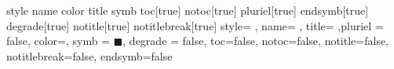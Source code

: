 

 {style}{}
 {name}{}
 {color}{}
 {title}{}
 {symb}{}
 {toc}[true]{} 
 {notoc}[true]{} 
 {pluriel}[true]{} 
 {endsymb}[true]{} 
 {degrade}[true]{} 
 {notitle}[true]{} 
 {notitlebreak}[true]{}
 {style= , name= , title= ,pluriel = false, color=, symb = $\blacksquare$, degrade = false, toc=false, notoc=false, notitle=false, notitlebreak=false, endsymb=false}{}

\newcommand*{\env}[1][]{\pasEnv[#1]}

